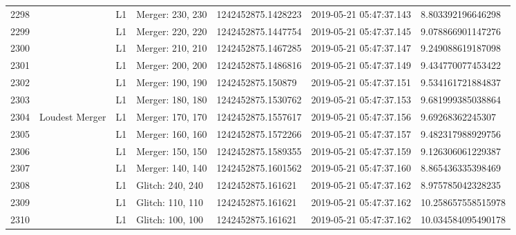 \begin{longtable}{lllllll}
2298 &                                                    &       L1 &  Merger: 230, 230 &  1242452875.1428223 &  2019-05-21 05:47:37.143 &   8.803392196646298 \\
2299 &                                                    &       L1 &  Merger: 220, 220 &  1242452875.1447754 &  2019-05-21 05:47:37.145 &   9.078866901147276 \\
2300 &                                                    &       L1 &  Merger: 210, 210 &  1242452875.1467285 &  2019-05-21 05:47:37.147 &   9.249088619187098 \\
2301 &                                                    &       L1 &  Merger: 200, 200 &  1242452875.1486816 &  2019-05-21 05:47:37.149 &   9.434770077453422 \\
2302 &                                                    &       L1 &  Merger: 190, 190 &   1242452875.150879 &  2019-05-21 05:47:37.151 &   9.534161721884837 \\
2303 &                                                    &       L1 &  Merger: 180, 180 &  1242452875.1530762 &  2019-05-21 05:47:37.153 &   9.681999385038864 \\
2304 &                                     Loudest Merger &       L1 &  Merger: 170, 170 &  1242452875.1557617 &  2019-05-21 05:47:37.156 &    9.69268362245307 \\
2305 &                                                    &       L1 &  Merger: 160, 160 &  1242452875.1572266 &  2019-05-21 05:47:37.157 &   9.482317988929756 \\
2306 &                                                    &       L1 &  Merger: 150, 150 &  1242452875.1589355 &  2019-05-21 05:47:37.159 &   9.126306061229387 \\
2307 &                                                    &       L1 &  Merger: 140, 140 &  1242452875.1601562 &  2019-05-21 05:47:37.160 &   8.865436335398469 \\
2308 &                                                    &       L1 &  Glitch: 240, 240 &   1242452875.161621 &  2019-05-21 05:47:37.162 &   8.975785042328235 \\
2309 &                                                    &       L1 &  Glitch: 110, 110 &   1242452875.161621 &  2019-05-21 05:47:37.162 &  10.258657558515978 \\
2310 &                                                    &       L1 &  Glitch: 100, 100 &   1242452875.161621 &  2019-05-21 05:47:37.162 &  10.034584095490178 \\

\end{longtable}
